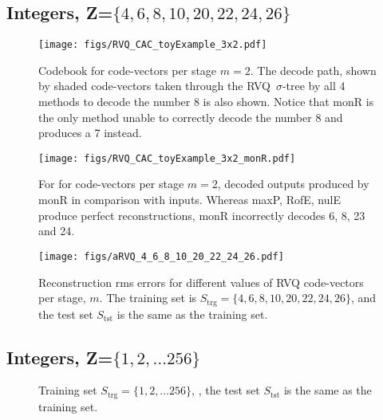 \clearpage
\newpage
\subsection{Integers, Z=$\{4, 6, 8, 10, 20, 22, 24, 26\}$}
								\begin{figure}[h!]
								\centering
								\texttt{[image: figs/RVQ\_CAC\_toyExample\_3x2.pdf]}
								\caption{Codebook for code-vectors per stage $m=2$.  The decode path, shown by shaded code-vectors taken through the RVQ~$\sigma$-tree by all 4 methods to decode the number 8 is also shown.  Notice that monR is the only method unable to correctly decode the number 8 and produces a 7 instead.}
								\end{figure}
															

								\begin{figure}[h!]
								\centering
								\texttt{[image: figs/RVQ\_CAC\_toyExample\_3x2\_monR.pdf]}
								\caption{For for code-vectors per stage $m=2$, decoded outputs produced by monR in comparison with inputs.  Whereas maxP, RofE, nulE produce perfect reconstructions, monR incorrectly decodes 6, 8, 23 and 24.}
								\end{figure}


								\begin{figure}[h]
								\centering
								
								\texttt{[image: figs/aRVQ\_4\_6\_8\_10\_20\_22\_24\_26.pdf]}
								\caption{Reconstruction rms errors for different values of RVQ code-vectors per stage, $m$.  The training set is $S_{\textrm{trg}}=\{4, 6, 8, 10, 20, 22, 24, 26\}$, and the test set $S_{\textrm{tst}}$ is the same as the training set.}
								\label{fig:aRVQ_4_6_8_10_20_22_24_26}
								\end{figure}
\clearpage
\newpage
\subsection{Integers, Z=$\{1, 2, \ldots 256\}$}
								\begin{figure}[h]
								\centering
								\subtable{\begin{tiny}\end{tiny}}
								\caption{Training set  $S_{\textrm{trg}}=\{1, 2, \ldots 256\}$, , the test set $S_{\textrm{tst}}$ is the same as the training set.}
								\label{fig:aRVQ_1_to_256}
								\end{figure}

